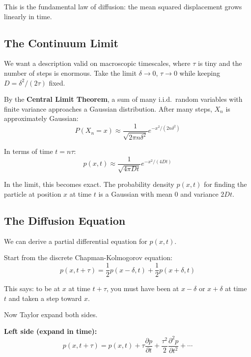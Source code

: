 \documentclass[11pt,a4paper]{article}
\begin{document}
	This is the fundamental law of diffusion: the mean squared displacement grows linearly in time.
	
	\subsection{The Continuum Limit}
	
	We want a description valid on macroscopic timescales, where $\tau$ is tiny and the number of steps is enormous. Take the limit $\delta \to 0$, $\tau \to 0$ while keeping $D = \delta^2 / (2\tau)$ fixed.
	
	By the \textbf{Central Limit Theorem}, a sum of many i.i.d.\ random variables with finite variance approaches a Gaussian distribution. After many steps, $X_n$ is approximately Gaussian:
	\begin{equation}
		P(X_n = x) \approx \frac{1}{\sqrt{2\pi n \delta^2}} e^{-x^2 / (2n\delta^2)}
	\end{equation}
	
	In terms of time $t = n\tau$:
	\begin{equation}
		p(x,t) \approx \frac{1}{\sqrt{4\pi D t}} e^{-x^2 / (4Dt)}
	\end{equation}
	
	In the limit, this becomes exact. The probability density $p(x,t)$ for finding the particle at position $x$ at time $t$ is a Gaussian with mean $0$ and variance $2Dt$.
	
	\subsection{The Diffusion Equation}
	
	We can derive a partial differential equation for $p(x,t)$.
	
	Start from the discrete Chapman-Kolmogorov equation:
	\begin{equation}
		p(x, t+\tau) = \frac{1}{2} p(x-\delta, t) + \frac{1}{2} p(x+\delta, t)
	\end{equation}
	
	This says: to be at $x$ at time $t+\tau$, you must have been at $x-\delta$ or $x+\delta$ at time $t$ and taken a step toward $x$.
	
	Now Taylor expand both sides.
	
	\textbf{Left side (expand in time):}
	\begin{equation}
		p(x, t+\tau) = p(x,t) + \tau \frac{\partial p}{\partial t} + \frac{\tau^2}{2} \frac{\partial^2 p}{\partial t^2} + \cdots
	\end{equation}
	
\end{document}
